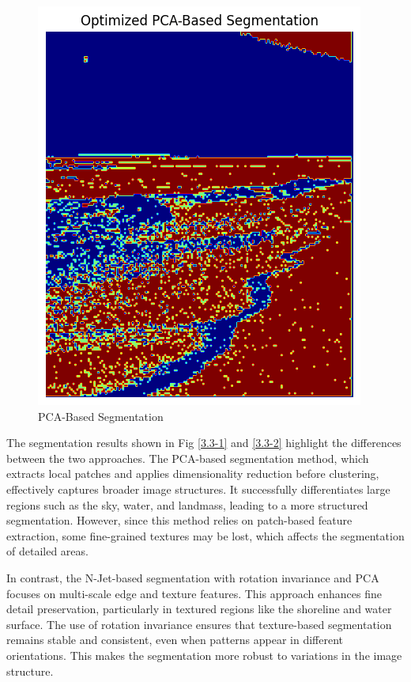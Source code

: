 \documentclass[12pt]{article}
\begin{document}
\begin{figure}[h]
\begin{minipage}{0.48\textwidth}
        \includegraphics[width=\textwidth]{pics/a6-3.3-2.png}
        \caption{PCA-Based Segmentation}
        \label{fig:3.3-2}
    \end{minipage}
\end{figure}


The segmentation results shown in Fig \ref{3.3-1} and \ref{3.3-2} highlight the differences between the two approaches. The PCA-based segmentation method, which extracts local patches and applies dimensionality reduction before clustering, effectively captures broader image structures. It successfully differentiates large regions such as the sky, water, and landmass, leading to a more structured segmentation. However, since this method relies on patch-based feature extraction, some fine-grained textures may be lost, which affects the segmentation of detailed areas.

In contrast, the N-Jet-based segmentation with rotation invariance and PCA focuses on multi-scale edge and texture features. This approach enhances fine detail preservation, particularly in textured regions like the shoreline and water surface. The use of rotation invariance ensures that texture-based segmentation remains stable and consistent, even when patterns appear in different orientations. This makes the segmentation more robust to variations in the image structure.
\end{document}
